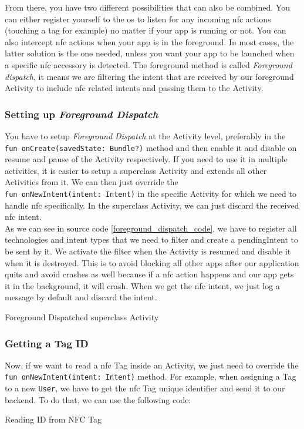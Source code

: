\documentclass[twoside, openright,11pt,a4paper]{book}
\newenvironment{code}{\captionsetup{type=listing}}{}
\begin{document}
From there, you have two different possibilities that can also be combined. You can either register yourself to the \gls{os} to listen for any incoming \gls{nfc} actions (touching a tag for example) no matter if your app is running or not. You can also intercept \gls{nfc} actions when your app is in the foreground. In most cases, the latter solution is the one needed, unless you want your app to be launched when a specific \gls{nfc} accessory is detected. The foreground method is called \emph{Foreground dispatch}, it means we are filtering the intent that are received by our foreground Activity to include \gls{nfc} related intents and passing them to the Activity.

\subsubsection{Setting up \emph{Foreground Dispatch}}
\label{foreground_dispatch}
You have to setup \emph{Foreground Dispatch}\cite{android:doc:nfc_foregroundDispatch} at the Activity level, preferably in the \texttt{fun onCreate(savedState: Bundle?)} method and then enable it and disable on resume and pause of the Activity respectively. If you need to use it in multiple activities, it is easier to setup a superclass Activity and extends all other Activities from it. We can then just override the \\\texttt{fun onNewIntent(intent: Intent)} in the specific Activity for which we need to handle \gls{nfc} specifically. In the superclass Activity, we can just discard the received \gls{nfc} intent.\\

As we can see in source code \ref{foreground_dispatch_code}, we have to register all technologies and intent types that we need to filter and create a pendingIntent to be sent by it. We activate the filter when the Activity is resumed and disable it when it is destroyed. This is to avoid blocking all other apps after our application quits and avoid crashes as well because if a \gls{nfc} action happens and our app gets it in the background, it will crash. When we get the \gls{nfc} intent, we just log a message by default and discard the intent.

\begin{code}
	\caption{Foreground Dispatched superclass Activity}
	\label{foreground_dispatch_code}
\end{code}
\subsubsection{Getting a Tag ID}
Now, if we want to read a \gls{nfc} Tag inside an Activity, we just need to override the \texttt{fun onNewIntent(intent: Intent)} method. For example, when assigning a Tag to a new \verb+User+, we have to get the \gls{nfc} Tag unique identifier and send it to our backend. To do that, we can use the following code:
\begin{code}
	\caption{Reading ID from NFC Tag}
\end{code}
\end{document}
